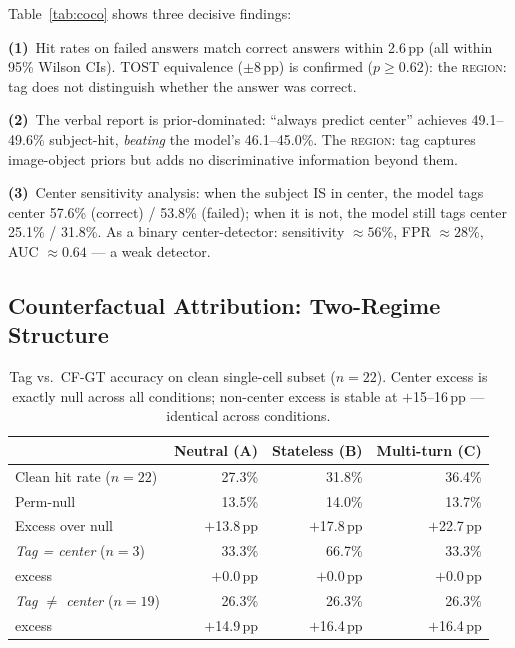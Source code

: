 \documentclass[twoside,11pt]{article}
\begin{document}
Table~\ref{tab:coco} shows three decisive findings:

\textbf{(1)}~Hit rates on failed answers match correct answers within 2.6\,pp
(all within 95\% Wilson CIs).
TOST equivalence ($\pm 8$\,pp) is confirmed ($p{\geq}0.62$):
the \textsc{region:} tag does not distinguish whether the answer was correct.

\textbf{(2)}~The verbal report is prior-dominated:
``always predict center'' achieves 49.1--49.6\% subject-hit, \emph{beating} the
model's 46.1--45.0\%.
The \textsc{region:} tag captures image-object priors but adds no discriminative
information beyond them.

\textbf{(3)}~Center sensitivity analysis:
when the subject IS in center, the model tags center 57.6\% (correct) /
53.8\% (failed); when it is not, the model still tags center 25.1\% / 31.8\%.
As a binary center-detector: sensitivity ${\approx}56\%$, FPR ${\approx}28\%$,
AUC ${\approx}0.64$ — a weak detector.

\subsection{Counterfactual Attribution: Two-Regime Structure}
\label{sec:cf}

\begin{table}[t]
\centering
\small
\begin{tabular}{lrrr}
\toprule
 & Neutral (A) & Stateless (B) & Multi-turn (C) \\
\midrule
Clean hit rate ($n{=}22$) & 27.3\% & 31.8\% & 36.4\% \\
Perm-null & 13.5\% & 14.0\% & 13.7\% \\
Excess over null & $+$13.8\,pp & $+$17.8\,pp & $+$22.7\,pp \\
\midrule
\emph{Tag = center} ($n{=}3$) & 33.3\% & 66.7\% & 33.3\% \\
excess & $+$0.0\,pp & $+$0.0\,pp & $+$0.0\,pp \\
\emph{Tag $\neq$ center} ($n{=}19$) & 26.3\% & 26.3\% & 26.3\% \\
excess & $+$14.9\,pp & $+$16.4\,pp & $+$16.4\,pp \\
\bottomrule
\end{tabular}
\caption{Tag vs.\ CF-GT accuracy on clean single-cell subset ($n{=}22$).
Center excess is exactly null across all conditions; non-center excess is
stable at $+$15--16\,pp — identical across conditions.}
\label{tab:cf}
\end{table}
\end{document}
